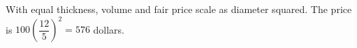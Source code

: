 With equal thickness, volume and fair price scale as diameter squared. The price is $100(\dfrac{12}{5})^2=\boxed{576}$ dollars.
